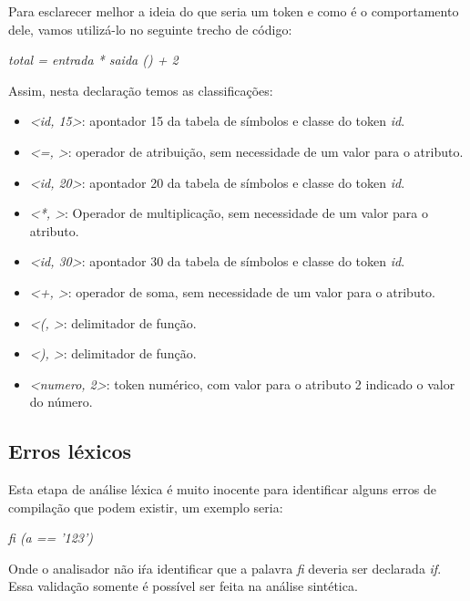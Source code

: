 Para esclarecer melhor a ideia do que seria um token e como é o comportamento dele, vamos utilizá-lo no seguinte trecho de código:

\emph{total = entrada * saida () + 2}

Assim, nesta declaração temos as classificações:

\begin{itemize}
  \item \emph{<id, 15>}: apontador 15 da tabela de símbolos e classe do token \emph{id}.
  \item \emph{<=, >}: operador de atribuição, sem necessidade de um valor para o atributo.
  \item \emph{<id, 20>}: apontador 20 da tabela de símbolos e classe do token \emph{id}.
  \item \emph{<*, >}: Operador de multiplicação, sem necessidade de um valor para o atributo.
  \item \emph{<id, 30>}: apontador 30 da tabela de símbolos e classe do token \emph{id}.
  \item \emph{<+, >}: operador de soma, sem necessidade de um valor para o atributo.
  \item \emph{<(, >}: delimitador de função.
  \item \emph{<), >}: delimitador de função.
  \item \emph{<numero, 2>}: token numérico, com valor para o atributo 2 indicado o valor do número.
\end{itemize}

\subsection{Erros léxicos}

Esta etapa de análise léxica é muito inocente para identificar alguns erros de compilação que podem existir, um exemplo seria:

\emph{fi (a == '123')}

Onde o analisador não iŕa identificar que a palavra \emph{fi} deveria ser declarada \emph{if}.
Essa validação somente é possível ser feita na análise sintética.

